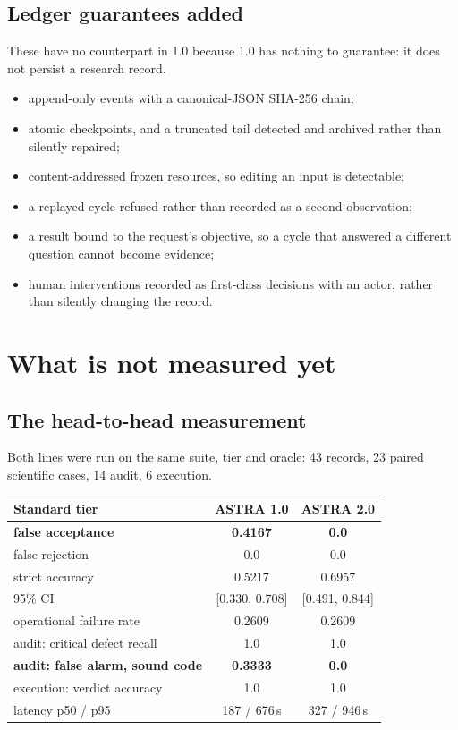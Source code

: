 \documentclass[11pt,a4paper]{article}
\begin{document}
\subsection{Ledger guarantees added}

These have no counterpart in 1.0 because 1.0 has nothing to guarantee: it does
not persist a research record.

\begin{itemize}[leftmargin=*,itemsep=1pt]
  \item append-only events with a canonical-JSON SHA-256 chain;
  \item atomic checkpoints, and a truncated tail detected and archived rather
        than silently repaired;
  \item content-addressed frozen resources, so editing an input is detectable;
  \item a replayed cycle refused rather than recorded as a second observation;
  \item a result bound to the request's objective, so a cycle that answered a
        different question cannot become evidence;
  \item human interventions recorded as first-class decisions with an actor,
        rather than silently changing the record.
\end{itemize}

\section{What is not measured yet}

\subsection{The head-to-head measurement}

Both lines were run on the same suite, tier and oracle: 43 records, 23 paired
scientific cases, 14 audit, 6 execution.

\begin{center}
\small
\begin{tabular}{@{}lcc@{}}
\toprule
\textbf{Standard tier} & \textbf{ASTRA 1.0} & \textbf{ASTRA 2.0} \\
\midrule
\textbf{false acceptance}            & \textbf{0.4167} & \textbf{0.0} \\
false rejection                      & 0.0    & 0.0 \\
strict accuracy                      & 0.5217 & 0.6957 \\
95\% CI                              & [0.330, 0.708] & [0.491, 0.844] \\
operational failure rate             & 0.2609 & 0.2609 \\
audit: critical defect recall        & 1.0    & 1.0 \\
\textbf{audit: false alarm, sound code} & \textbf{0.3333} & \textbf{0.0} \\
execution: verdict accuracy          & 1.0    & 1.0 \\
latency p50 / p95                    & 187 / 676\,s & 327 / 946\,s \\
\bottomrule
\end{tabular}
\end{center}
\end{document}
